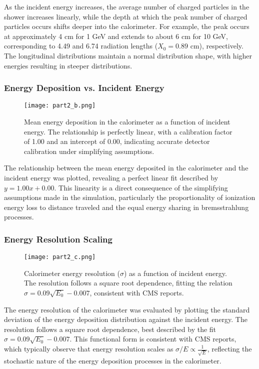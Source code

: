 \documentclass[twocolumn]{aastex631}
\begin{document}
As the incident energy increases, the average number of charged particles in the shower increases linearly, while the depth at which the peak number of charged particles occurs shifts deeper into the calorimeter. For example, the peak occurs at approximately 4 cm for 1 GeV and extends to about 6 cm for 10 GeV, corresponding to 4.49 and 6.74 radiation lengths (\(X_0 = 0.89\) cm), respectively. The longitudinal distributions maintain a normal distribution shape, with higher energies resulting in steeper distributions.

\subsubsection{Energy Deposition vs. Incident Energy}

\begin{figure}[htp]
    \centering
    \texttt{[image: part2\_b.png]}
    \caption{Mean energy deposition in the calorimeter as a function of incident energy. The relationship is perfectly linear, with a calibration factor of 1.00 and an intercept of 0.00, indicating accurate detector calibration under simplifying assumptions.}
    \label{fig:energy_deposition_vs_incident_energy}
\end{figure}

The relationship between the mean energy deposited in the calorimeter and the incident energy was plotted, revealing a perfect linear fit described by \(y = 1.00x + 0.00\). This linearity is a direct consequence of the simplifying assumptions made in the simulation, particularly the proportionality of ionization energy loss to distance traveled and the equal energy sharing in bremsstrahlung processes.

\subsubsection{Energy Resolution Scaling}

\begin{figure}[htp]
    \centering
    \texttt{[image: part2\_c.png]}
    \caption{Calorimeter energy resolution (\(\sigma\)) as a function of incident energy. The resolution follows a square root dependence, fitting the relation \(\sigma = 0.09 \sqrt{E_0} - 0.007\), consistent with CMS reports.}
    \label{fig:energy_resolution_vs_energy}
\end{figure}

The energy resolution of the calorimeter was evaluated by plotting the standard deviation of the energy deposition distribution against the incident energy. The resolution follows a square root dependence, best described by the fit \(\sigma = 0.09 \sqrt{E_0} - 0.007\). This functional form is consistent with CMS reports, which typically observe that energy resolution scales as \(\sigma/E \propto \frac{1}{\sqrt{E}}\), reflecting the stochastic nature of the energy deposition processes in the calorimeter.
\end{document}
